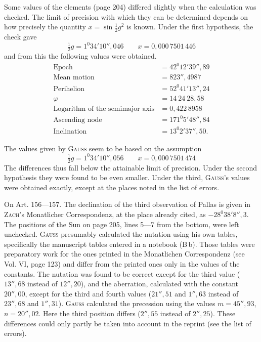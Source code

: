 Some values of the elements (page 204) differed slightly when the calculation was
checked. The limit of precision with which they can be determined depends on how
precisely the quantity $x = \sin\tfrac12 g^2$ is known. Under the first hypothesis,
the check gave
\[
\tfrac12 g = 1^0 34' 10''{,}046 \qquad x = 0{,}000\,7501\,446
\]
and from this the following values were obtained.
\[
\begin{aligned}
\text{Epoch} &= 42^0 12' 39''{,}89 \\
\text{Mean motion} &= 823''{,}4987 \\
\text{Perihelion} &= 52^0 41' 13''{,}24 \\
\varphi &= 14\ 24\ 28{,}58 \\
\text{Logarithm of the semimajor axis} &= 0{,}422\,8958 \\
\text{Ascending node} &= 171^0 5' 48''{,}84 \\
\text{Inclination} &= 13^0 2' 37''{,}50.
\end{aligned}
\]

The values given by \textsc{Gauss} seem to be based on the assumption
\[
\tfrac12 g = 1^0 34' 10''{,}056 \qquad x = 0{,}000\,7501\,474
\]
The differences thus fall below the attainable limit of precision. Under the second
hypothesis they were found to be even smaller. Under the third, \textsc{Gauss}'s
values were obtained exactly, except at the places noted in the list of errors.

On Art. 156---157. The declination of the third observation of Pallas is given in
\textsc{Zach}'s Monatlicher Correspondenz, at the place already cited, as
$-28^0 38' 8''{,}3$. The positions of the Sun on page 205, lines 5---7 from the bottom,
were left unchecked. \textsc{Gauss} presumably calculated the nutation using his own
tables, specifically the manuscript tables entered in a notebook (B\,b). Those tables
were preparatory work for the ones printed in the Monatlichen Correspondenz (see
Vol. VI, page 123) and differ from the printed ones only in the values of the constants.
The nutation was found to be correct except for the third value ($13''{,}68$ instead
of $12''{,}20$), and the aberration, calculated with the constant $20''{,}00$, except
for the third and fourth values ($21''{,}51$ and $1''{,}63$ instead of $23''{,}68$ and
$1''{,}31$). \textsc{Gauss} calculated the precession using the values $m = 45''{,}93$,
$n = 20''{,}02$. Here the third position differs ($2''{,}55$ instead of $2''{,}25$).
These differences could only partly be taken into account in the reprint (see the
list of errors).

